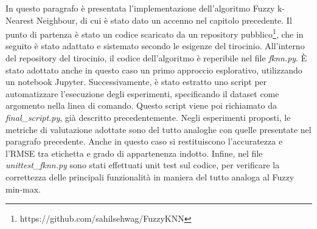 \documentclass[11pt,  oneside, openany]{book}
\begin{document}
In questo paragrafo è presentata l'implementazione dell'algoritmo Fuzzy k-Nearest Neighbour, di cui è stato dato un accenno nel capitolo precedente. Il punto di partenza è stato un codice scaricato da un repository pubblico\footnote{https://github.com/sahilsehwag/FuzzyKNN}, che in seguito è stato adattato e sistemato secondo le esigenze del tirocinio. All'interno del repository del tirocinio, il codice dell'algoritmo è reperibile nel file \textit{fknn.py}. È stato adottato anche in questo caso un primo approccio esplorativo, utilizzando un notebook Jupyter. Successivamente, è stato estratto uno script per automatizzare l'esecuzione degli esperimenti, specificando il dataset come argomento nella linea di comando. Questo script viene poi richiamato da \textit{final\_script.py}, già descritto precedentemente. Negli esperimenti proposti, le metriche di valutazione adottate sono del tutto analoghe con quelle presentate nel paragrafo precedente. Anche in questo caso si restituiscono l'accuratezza e l'RMSE tra etichetta e grado di appartenenza indotto.  Infine, nel file \textit{unittest\_fknn.py} sono stati effettuati unit test sul codice, per verificare la correttezza delle principali funzionalità in maniera del tutto analoga al Fuzzy min-max. 
\end{document}
